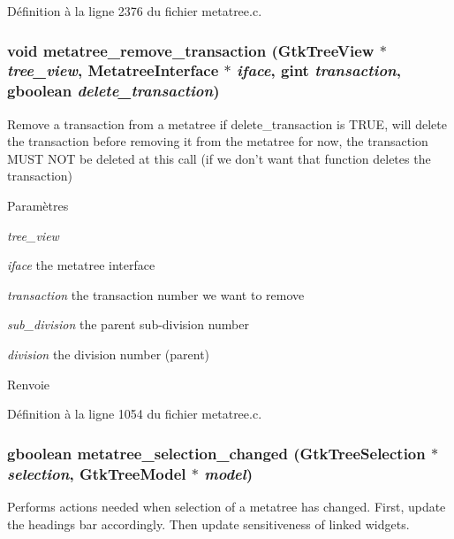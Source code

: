 Définition à la ligne 2376 du fichier metatree.c.

\subsubsection[{metatree\_\-remove\_\-transaction}]{\setlength{\rightskip}{0pt plus 5cm}void metatree\_\-remove\_\-transaction (GtkTreeView $\ast$ {\em tree\_\-view}, \/  {\bf MetatreeInterface} $\ast$ {\em iface}, \/  gint {\em transaction}, \/  gboolean {\em delete\_\-transaction})}\label{metatree_8h_a65e380c4327a404b4d9686292e8e8e6e}
Remove a transaction from a metatree if delete\_\-transaction is TRUE, will delete the transaction before removing it from the metatree for now, the transaction MUST NOT be deleted at this call (if we don't want that function deletes the transaction)


\begin{DoxyParams}{Paramètres}
\item[{\em tree\_\-view}]\item[{\em iface}]the metatree interface \item[{\em transaction}]the transaction number we want to remove \item[{\em sub\_\-division}]the parent sub-\/division number \item[{\em division}]the division number (parent)\end{DoxyParams}
\begin{DoxyReturn}{Renvoie}

\end{DoxyReturn}


Définition à la ligne 1054 du fichier metatree.c.

\subsubsection[{metatree\_\-selection\_\-changed}]{\setlength{\rightskip}{0pt plus 5cm}gboolean metatree\_\-selection\_\-changed (GtkTreeSelection $\ast$ {\em selection}, \/  GtkTreeModel $\ast$ {\em model})}\label{metatree_8h_af2fb2eaf7cbecb065aa16959047b9f6d}
Performs actions needed when selection of a metatree has changed. First, update the headings bar accordingly. Then update sensitiveness of linked widgets.

